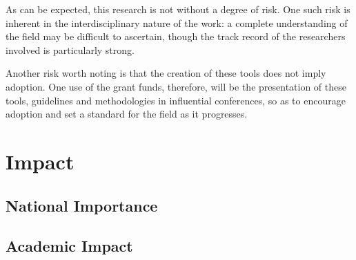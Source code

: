 As can be expected, this research is not without a degree of risk. One such risk is inherent in the interdisciplinary nature of the work: a complete understanding of the field may be difficult to ascertain, though the track record of the researchers involved is particularly strong.\par

Another risk worth noting is that the creation of these tools does not imply adoption. One use of the grant funds, therefore, will be the presentation of these tools, guidelines and methodologies in influential conferences, so as to encourage adoption and set a standard for the field as it progresses.\par

\section{Impact}
\label{sec:proposed_approach}


\subsection*{National Importance}
\label{sec:national_importance}

\subsection*{Academic Impact}
\label{sec:academic_impact}



\let\oldbibliography\thebibliography
\renewcommand{\thebibliography}[1]{\oldbibliography{#1}
\setlength{\itemsep}{-3pt}}


{
\scriptsize

}

